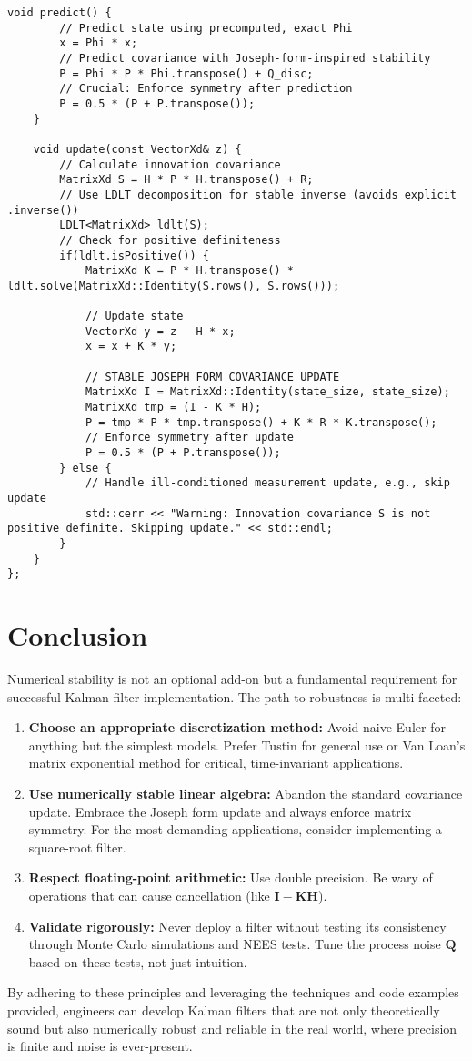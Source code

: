 \documentclass[11pt]{article}
\begin{document}
\begin{lstlisting}[caption=Robust Kalman Filter Implementation]
    void predict() {
        // Predict state using precomputed, exact Phi
        x = Phi * x;
        // Predict covariance with Joseph-form-inspired stability
        P = Phi * P * Phi.transpose() + Q_disc;
        // Crucial: Enforce symmetry after prediction
        P = 0.5 * (P + P.transpose());
    }

    void update(const VectorXd& z) {
        // Calculate innovation covariance
        MatrixXd S = H * P * H.transpose() + R;
        // Use LDLT decomposition for stable inverse (avoids explicit .inverse())
        LDLT<MatrixXd> ldlt(S);
        // Check for positive definiteness
        if(ldlt.isPositive()) {
            MatrixXd K = P * H.transpose() * ldlt.solve(MatrixXd::Identity(S.rows(), S.rows()));

            // Update state
            VectorXd y = z - H * x;
            x = x + K * y;

            // STABLE JOSEPH FORM COVARIANCE UPDATE
            MatrixXd I = MatrixXd::Identity(state_size, state_size);
            MatrixXd tmp = (I - K * H);
            P = tmp * P * tmp.transpose() + K * R * K.transpose();
            // Enforce symmetry after update
            P = 0.5 * (P + P.transpose());
        } else {
            // Handle ill-conditioned measurement update, e.g., skip update
            std::cerr << "Warning: Innovation covariance S is not positive definite. Skipping update." << std::endl;
        }
    }
};
\end{lstlisting}

\section{Conclusion}
Numerical stability is not an optional add-on but a fundamental requirement for successful Kalman filter implementation. The path to robustness is multi-faceted:
\begin{enumerate}
    \item \textbf{Choose an appropriate discretization method:} Avoid naive Euler for anything but the simplest models. Prefer Tustin for general use or Van Loan's matrix exponential method for critical, time-invariant applications.
    \item \textbf{Use numerically stable linear algebra:} Abandon the standard covariance update. Embrace the Joseph form update and always enforce matrix symmetry. For the most demanding applications, consider implementing a square-root filter.
    \item \textbf{Respect floating-point arithmetic:} Use double precision. Be wary of operations that can cause cancellation (like $\bm{I} - \bm{KH}$).
    \item \textbf{Validate rigorously:} Never deploy a filter without testing its consistency through Monte Carlo simulations and NEES tests. Tune the process noise $\bm{Q}$ based on these tests, not just intuition.
\end{enumerate}
By adhering to these principles and leveraging the techniques and code examples provided, engineers can develop Kalman filters that are not only theoretically sound but also numerically robust and reliable in the real world, where precision is finite and noise is ever-present.
\end{document}
